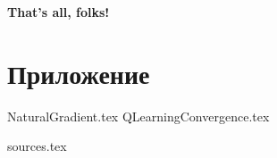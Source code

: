 \documentclass[a4paper, 10pt, oneside]{memoir}
\begin{document}


\newpage
\tableofcontents*










\vspace{2cm}
\begin{center}
\textbf{That's all, folks!}
\end{center}

\newpage

\appendix

\chapter{Приложение}

{NaturalGradient.tex}
{QLearningConvergence.tex}

{sources.tex}
\end{document}
